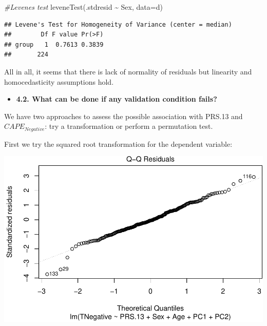 \documentclass[
]{article}
\newenvironment{Shaded}{\begin{snugshade}}{\end{snugshade}}
\newcommand{\AttributeTok}[1]{\textcolor[rgb]{0.77,0.63,0.00}{#1}}
\newcommand{\CommentTok}[1]{\textcolor[rgb]{0.56,0.35,0.01}{\textit{#1}}}
\newcommand{\DecValTok}[1]{\textcolor[rgb]{0.00,0.00,0.81}{#1}}
\newcommand{\FloatTok}[1]{\textcolor[rgb]{0.00,0.00,0.81}{#1}}
\newcommand{\FunctionTok}[1]{\textcolor[rgb]{0.00,0.00,0.00}{#1}}
\newcommand{\NormalTok}[1]{#1}
\newcommand{\OtherTok}[1]{\textcolor[rgb]{0.56,0.35,0.01}{#1}}
\newcommand{\SpecialCharTok}[1]{\textcolor[rgb]{0.00,0.00,0.00}{#1}}
\providecommand{\tightlist}{%
  \setlength{\itemsep}{0pt}\setlength{\parskip}{0pt}}
\begin{document}
\begin{Shaded}
\begin{Highlighting}[]
\CommentTok{\#Levene\textquotesingle{}s test}
\FunctionTok{leveneTest}\NormalTok{(.stdresid }\SpecialCharTok{\textasciitilde{}}\NormalTok{ Sex, }\AttributeTok{data=}\NormalTok{d)}
\end{Highlighting}
\end{Shaded}

\begin{verbatim}
## Levene's Test for Homogeneity of Variance (center = median)
##        Df F value Pr(>F)
## group   1  0.7613 0.3839
##       224
\end{verbatim}

All in all, it seems that there is lack of normality of residuals but
linearity and homocedasticity assumptions hold.

\begin{itemize}
\tightlist
\item
  \textbf{4.2. What can be done if any validation condition fails?}
\end{itemize}

We have two approaches to assess the possible association with PRS.13
and \(CAPE_{Negative}\): try a transformation or perform a permutation
test.

First we try the squared root transformation for the dependent variable:

\begin{Shaded}
\end{Shaded}

\includegraphics{Real_data_CAPE_Negative_code_files/figure-latex/unnamed-chunk-11-1.pdf}
\end{document}
